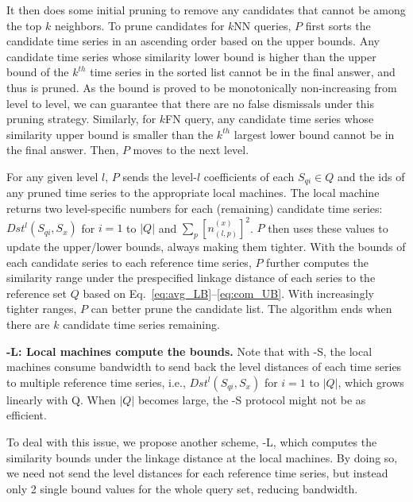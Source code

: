 It then does some initial pruning to remove any candidates that
cannot be among the top $k$ neighbors. To prune candidates for $k$NN
queries, $P$ first sorts the candidate time series in an ascending
order based on the upper bounds.  Any candidate time series whose
similarity lower bound is higher than the upper bound of the $k^{th}$
time series in the sorted list cannot be in the final answer, and thus
is pruned.  As the bound is proved to be monotonically non-increasing
from level to level, we can guarantee that there are no false
dismissals under this pruning strategy. Similarly, for $k$FN query, any
candidate time series whose similarity upper bound is smaller than the
$k^{th}$ largest lower bound cannot be in the final answer. Then, $P$
moves to the next level.

For any given level $l$, $P$ sends the level-$l$ coefficients of each
$S_{qi} \in Q$ and the ids of any pruned time series to the appropriate local
machines.  The local machine returns two level-specific numbers
for each (remaining) candidate time series: $Dst^{l}(S_{qi}, S_x)$ for $i=1$ to
$|Q|$ and $\sum_{p}[n_{(l,p)}^{(x)}]^2$.  $P$ then uses these values to
update the upper/lower bounds, always making them tighter. With the
bounds of each candidate series to each reference time series, $P$
further computes the similarity range under the prespecified linkage distance
of each series to the reference set $Q$ based on
Eq.~\eqref{eq:avg_LB}--\eqref{eq:com_UB}. With increasingly tighter
ranges, $P$ can better prune the candidate list.  The algorithm ends
when there are $k$ candidate time series remaining.

\textbf{\MSWave-L{}: Local machines compute the bounds.}
Note that with \MSWave-S{}, the local machines consume
bandwidth to send back the level distances of each time series to
multiple reference time series, i.e., $Dst^{l}(S_{qi}, S_x)$ for $i=1$
to $|Q|$, which grows linearly with Q. When $|Q|$ becomes large, the
\MSWave-S{} protocol might not be as efficient.

To deal with this issue, we propose another scheme, \MSWave-L{},
which computes the similarity bounds under the linkage distance at the
local machines. By doing so, we need not send the level distances for
each reference time series, but instead only 2 single bound values for
the whole query set, reducing bandwidth.

